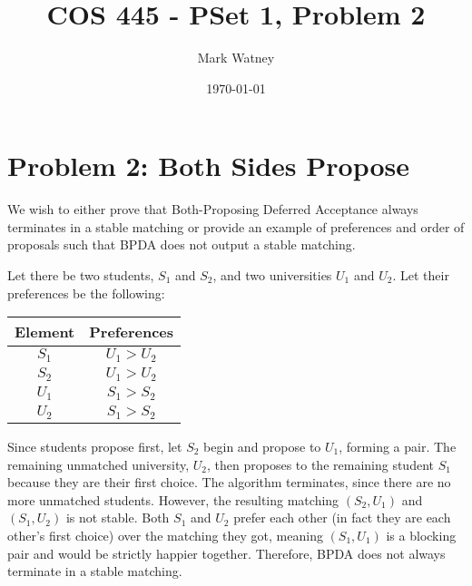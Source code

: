 \documentclass[12pt]{article}%
\begin{document}
\title{COS 445 - PSet 1, Problem 2} %
\author{Mark Watney} %
\date{\today}
\maketitle
\section*{Problem 2: Both Sides Propose}
We wish to either prove that Both-Proposing Deferred Acceptance always terminates in a stable matching or provide an example of preferences and order of proposals such that BPDA does not output a stable matching.

Let there be two students, $S_1$ and $S_2$, and two universities $U_1$ and $U_2$. Let their preferences be the following:

\begin{center}
\begin{tabular}{|c|c|}
\hline
Element & Preferences \\ \hline
$S_1$   & $U_1 > U_2$ \\ \hline
$S_2$   & $U_1 > U_2$ \\ \hline
$U_1$   & $S_1 > S_2$ \\ \hline
$U_2$   & $S_1 > S_2$ \\ \hline
\end{tabular}
\end{center}

Since students propose first, let $S_2$ begin and propose to $U_1$, forming a pair. The remaining unmatched university, $U_2$, then proposes to the remaining student $S_1$ because they are their first choice. The algorithm terminates, since there are no more unmatched students. However, the resulting matching $(S_2, U_1)$ and $(S_1, U_2)$ is not stable. Both $S_1$ and $U_2$ prefer each other (in fact they are each other's first choice) over the matching they got, meaning $(S_1, U_1)$ is a blocking pair and would be strictly happier together. Therefore, BPDA does not always terminate in a stable matching.
\end{document}
